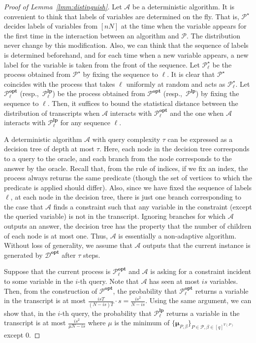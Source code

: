 \documentclass[letterpaper, 11pt]{article}
\newcommand{\calA}{\mathcal{A}}
\newcommand{\calD}{\mathcal{D}}
\newcommand{\calP}{\mathcal{P}}
\newcommand{\bimu}{\boldsymbol{\mu}}
\newcommand{\lp}{\mathbf{lp}}
\newcommand{\opt}{\mathbf{opt}}
\begin{document}
\begin{proof}[Proof of Lemma~\ref{lmm:distinguish}]
  Let $\calA$ be a deterministic algorithm.
  It is convenient to think that labels of variables are determined on the fly.
  That is, $\calP^{\star}$ decides labels of variables from $[nN]$ at the time when the variable appears for the first time in the interaction between an algorithm and $\calP$.
  The distribution never change by this modification.
  Also, 
  we can think that the sequence of labels is determined beforehand,
  and for each time when a new variable appears,
  a new label for the variable is taken from the front of the sequence.
  Let $\calP^{\star}_{\ell}$ be the process obtained from $\calP^{\star}$ by fixing the sequence to $\ell$.
  It is clear that $\calP^{\star}$ coincides with the process that takes $\ell$ uniformly at random and acts as $\calP^{\star}_{\ell}$.
  Let $\calP^{\opt}_{\ell}$ (resp.,~$\calP^{\lp}_{\ell}$) be the process obtained from $\calP^{\opt}$ (resp.,~$\calP^{\lp}$) by fixing the sequence to $\ell$.
  Then, it suffices to bound the statistical distance between the distribution of transcripts when $\calA$ interacts with $\calP^{\opt}_{\ell}$ and the one when $\calA$ interacts with $\calP^{\lp}_{\ell}$ for any sequence $\ell$.

  A deterministic algorithm $\calA$ with query complexity $\tau$ can be expressed as a decision tree of depth at most $\tau$.
  Here, each node in the decision tree corresponds to a query to the oracle,
  and each branch from the node corresponds to the answer by the oracle.
  Recall that, from the rule of indices,
  if we fix an index,
  the process always returns the same predicate (though the set of vertices to which the predicate is applied should differ).
  Also, 
  since we have fixed the sequence of labels $\ell$,
  at each node in the decision tree,  
  there is just one branch corresponding to the case that $\calA$ finds a constraint such that any variable in the constraint (except the queried variable) is not in the transcript.
  Ignoring branches for which $\calA$ outputs an answer,
  the decision tree has the property that the number of children of each node is at most one.
  Thus, $\calA$ is essentially a non-adaptive algorithm.
  Without loss of generality,
  we assume that $\calA$ outputs that the current instance is generated by $\calD^{\opt}$ after $\tau$ steps.
  
  Suppose that the current process is $\calP^{\opt}_{\ell}$ and $\calA$ is asking for a constraint incident to some variable in the $i$-th query.
  Note that $\calA$ has seen at most $is$ variables.
  Then, from the construction of $\calP^{\opt}$,
  the probability that $\calP^{\opt}_{\ell}$ returns a variable in the transcript is at most $\frac{isT}{(N-is)T}\cdot s = \frac{is^2}{N-is}$.
  Using the same argument,
  we can show that,
  in the $i$-th query,
  the probability that $\calP^{\lp}_{\ell}$ returns a variable in the transcript is at most $\frac{is^2}{\mu N-is}$ where $\mu$ is the minimum of $\{\bimu_{P,\beta}\}_{P \in \calP, \beta \in [q]^{V(P)}}$ except $0$.
  

\end{proof}
\end{document}
